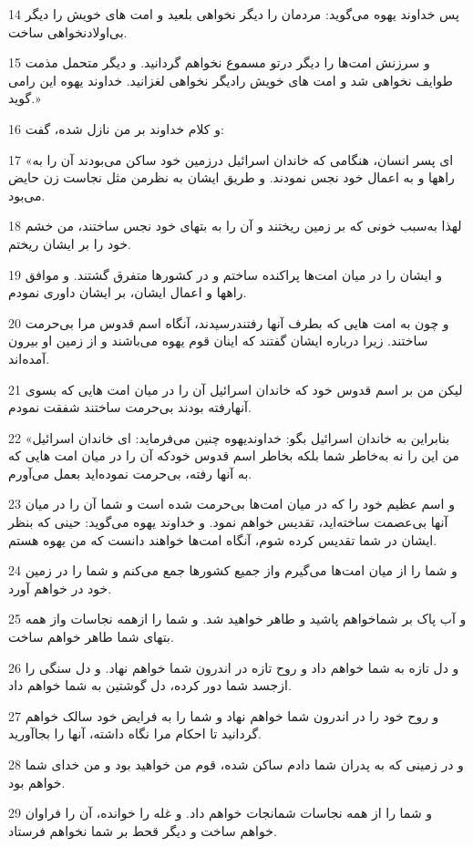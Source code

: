 \par 14 پس خداوند یهوه می‌گوید: مردمان را دیگر نخواهی بلعید و امت های خویش را دیگر بی‌اولادنخواهی ساخت.
\par 15 و سرزنش امت‌ها را دیگر درتو مسموع نخواهم گردانید. و دیگر متحمل مذمت طوایف نخواهی شد و امت های خویش رادیگر نخواهی لغزانید. خداوند یهوه این رامی گوید.»
\par 16 و کلام خداوند بر من نازل شده، گفت:
\par 17 «ای پسر انسان، هنگامی که خاندان اسرائیل درزمین خود ساکن می‌بودند آن را به راهها و به اعمال خود نجس نمودند. و طریق ایشان به نظرمن مثل نجاست زن حایض می‌بود.
\par 18 لهذا به‌سبب خونی که بر زمین ریختند و آن را به بتهای خود نجس ساختند، من خشم خود را بر ایشان ریختم.
\par 19 و ایشان را در میان امت‌ها پراکنده ساختم و در کشورها متفرق گشتند. و موافق راهها و اعمال ایشان، بر ایشان داوری نمودم.
\par 20 و چون به امت هایی که بطرف آنها رفتندرسیدند، آنگاه اسم قدوس مرا بی‌حرمت ساختند. زیرا درباره ایشان گفتند که اینان قوم یهوه می‌باشند و از زمین او بیرون آمده‌اند.
\par 21 لیکن من بر اسم قدوس خود که خاندان اسرائیل آن را در میان امت هایی که بسوی آنهارفته بودند بی‌حرمت ساختند شفقت نمودم.
\par 22 «بنابراین به خاندان اسرائیل بگو: خداوندیهوه چنین می‌فرماید: ای خاندان اسرائیل من این را نه به‌خاطر شما بلکه بخاطر اسم قدوس خودکه آن را در میان امت هایی که به آنها رفته، بی‌حرمت نموده‌اید بعمل می‌آورم.
\par 23 و اسم عظیم خود را که در میان امت‌ها بی‌حرمت شده است و شما آن را در میان آنها بی‌عصمت ساخته‌اید، تقدیس خواهم نمود. و خداوند یهوه می‌گوید: حینی که بنظر ایشان در شما تقدیس کرده شوم، آنگاه امت‌ها خواهند دانست که من یهوه هستم.
\par 24 و شما را از میان امت‌ها می‌گیرم واز جمیع کشورها جمع می‌کنم و شما را در زمین خود در خواهم آورد.
\par 25 و آب پاک بر شماخواهم پاشید و طاهر خواهید شد. و شما را ازهمه نجاسات واز همه بتهای شما طاهر خواهم ساخت.
\par 26 و دل تازه به شما خواهم داد و روح تازه در اندرون شما خواهم نهاد. و دل سنگی را ازجسد شما دور کرده، دل گوشتین به شما خواهم داد.
\par 27 و روح خود را در اندرون شما خواهم نهاد و شما را به فرایض خود سالک خواهم گردانید تا احکام مرا نگاه داشته، آنها را بجاآورید.
\par 28 و در زمینی که به پدران شما دادم ساکن شده، قوم من خواهید بود و من خدای شما خواهم بود.
\par 29 و شما را از همه نجاسات شمانجات خواهم داد. و غله را خوانده، آن را فراوان خواهم ساخت و دیگر قحط بر شما نخواهم فرستاد.

